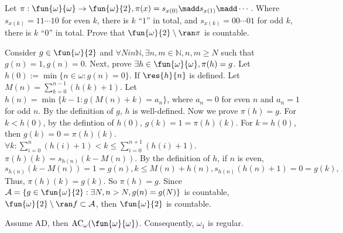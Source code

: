 \documentclass{ctexart}
\begin{document}
\begin{problem}
  Let \(\pi:\fun{\omega}{\omega} \to \fun{\omega}{2},\pi(x)=s_{x(0)}\madd s_{x(1)}\madd\cdots\). 
  Where \(s_{x(k)}=11\cdots10\) for even \(k\), there is \(k\) ``\(1\)'' in total, and \(s_{x(k)}=00\cdots0 1\) for odd \(k\), there is \(k\) ``\(0\)'' in total. 
  Prove that \(\fun{\omega}{2} \setminus \ran \pi\) is countable. 
\end{problem}

\begin{solution}
  Consider \(g \in \fun{\omega}{2}\) and \(\forall N in \mathbb{N}, \exists n,m \in \mathbb{N}, n,m \geq N\) such that 
  \(g(n) = 1, g(n) = 0\). 
  Next, prove \(\exists h \in \fun{ \omega}{\omega},\pi(h)=g\). 
  Let \(h(0):=\min\{n \in \omega:g(n)=0\}\). 
  If \(\res{h}{n}\) is defined. Let \(M(n)=\sum_{k=0}^{n-1} (h(k)+1) \). 
  Let \(h(n)= \min\{k- 1:g(M(n)+k)=a_n\}\), where \(a_n=0\) for even \(n\) and \(a_n=1\) for odd \(n\). 
  By the definition of \(g\), \(h\) is well-defined. Now we prove \(\pi(h)=g\). 
  For \(k<h(0)\), by the defintion of \(h(0)\), \(g(k)=1=\pi(h)(k)\). 
  For \(k=h(0)\), then \(g(k)=0=\pi(h)(k)\). 
  \(\forall k: \sum_{i=0}^{n} (h(i)+1) <k \leq \sum_{i=0}^{n+1} (h(i)+1)\). 
  \(\pi(h)(k)=s_{h(n)}(k-M(n) )\). By the definition of \(h\), if \(n\) is even, 
  \(s_{h(n)}(k-M(n))=1=g(n), k \leq M(n)+h(n), s_{h(n)}(h(n)+1)= 0 = g(k),\)
  Thus, \(\pi(h)(k) = g(k)\). So \(\pi(h)=g\).
  Since \(\mathcal{A} = \{g \in \fun{\omega}{2}: \exists N, n >N , g(n)=g(N)\}\) is countable,
  \(\fun{\omega}{2} \setminus \ran f \subset \mathcal{A}\), then \(\fun{\omega}{2}\) is countable.
\end{solution}

\begin{problem}
  Assume AD, then \(\mathrm{AC}_\omega(\fun{\omega}{\omega}) \). Consequently, \(\omega_1\) is regular. 
\end{problem}
\end{document}
